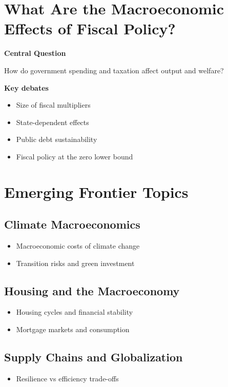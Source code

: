 \documentclass[12pt]{article}
\begin{document}
\section{What Are the Macroeconomic Effects of Fiscal Policy?}

\textbf{Central Question}

How do government spending and taxation affect output and welfare?

\textbf{Key debates}
\begin{itemize}
\item Size of fiscal multipliers
\item State-dependent effects
\item Public debt sustainability
\item Fiscal policy at the zero lower bound
\end{itemize}

\section{Emerging Frontier Topics}

\subsection*{Climate Macroeconomics}
\begin{itemize}
\item Macroeconomic costs of climate change
\item Transition risks and green investment
\end{itemize}

\subsection*{Housing and the Macroeconomy}
\begin{itemize}
\item Housing cycles and financial stability
\item Mortgage markets and consumption
\end{itemize}

\subsection*{Supply Chains and Globalization}
\begin{itemize}
\item Resilience vs efficiency trade-offs
\end{itemize}
\end{document}
